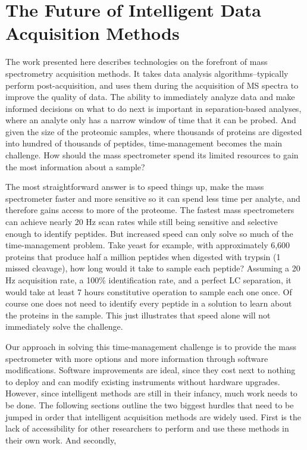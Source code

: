 \chapter{The Future of Intelligent Data Acquisition Methods}

The work presented here describes technologies on the forefront of mass spectrometry acquisition methods. It takes data analysis algorithms--typically perform post-acquisition, and uses them during the acquisition of MS spectra to improve the quality of data. The ability to immediately analyze data and make informed decisions on what to do next is important in separation-based analyses, where an analyte only has a narrow window of time that it can be probed. And given the size of the proteomic samples, where thousands of proteins are digested into hundred of thousands of peptides, time-management becomes the main challenge. How should the mass spectrometer spend its limited resources to gain the most information about a sample?

The most straightforward answer is to speed things up, make the mass spectrometer faster and more sensitive so it can spend less time per analyte, and therefore gains access to more of the proteome. The fastest mass spectrometers can achieve nearly 20 Hz scan rates while still being sensitive and selective enough to identify peptides. But increased speed can only solve so much of the time-management problem. Take yeast for example, with approximately 6,600 proteins that produce half a million peptides when digested with trypsin (1 missed cleavage), how long would it take to sample each peptide? Assuming a 20 Hz acquisition rate, a 100\% identification rate, and a perfect LC separation, it would take at least 7 hours constitutive operation to sample each one once. Of course one does not need to identify every peptide in a solution to learn about the proteins in the sample. This just illustrates that speed alone will not immediately solve the challenge. 

Our approach in solving this time-management challenge is to provide the mass spectrometer with more options and more information through software modifications.
Software improvements are ideal, since they cost next to nothing to deploy and can modify existing instruments without hardware upgrades. However, since intelligent methods are still in their infancy, much work needs to be done. The following sections outline the two biggest hurdles that need to be jumped in order that intelligent acquisition methods are widely used. First is the lack of accessibility for other researchers to perform and use these methods in their own work. And secondly,

